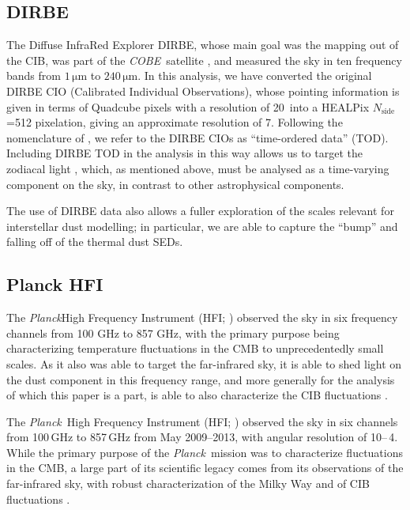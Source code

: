 \documentclass{aa}
\def\Planck{\textit{Planck}}
\def\COBE{\textit{COBE}}
\def\nside{$N_{\mathrm{side}}$}
\begin{document}
\subsection{DIRBE}
The Diffuse InfraRed Explorer DIRBE, whose main goal was the mapping out of the
CIB, was part of the \COBE\ satellite \citep{boggess92, silverberg93}, and
measured the sky in ten frequency bands from $1\,\mathrm{\mu m}$ to
$240\,\mathrm{\mu m}$. In this analysis, we have converted the original DIRBE
CIO (Calibrated Individual Observations), whose pointing information is given
in terms of Quadcube pixels with a resolution of 20\arcs\ into a HEALPix
\nside=512 pixelation, giving an approximate resolution of 7\arcm. Following
the nomenclature of \cite{CG02_01}, we refer to the DIRBE CIOs as
``time-ordered data'' (TOD). Including DIRBE TOD in the analysis in this way
allows us to target the zodiacal light \citep{CG02_02}, which, as mentioned
above, must be analysed as a time-varying component on the sky, in contrast to
other astrophysical components.

The use of DIRBE data also allows a fuller exploration of the scales relevant
for interstellar dust modelling; in particular, we are able to capture the
``bump'' and falling off of the thermal dust SEDs. 

\subsection{Planck HFI}
The \Planck High Frequency Instrument (HFI; \citealt{planck2016-l03}) observed
the sky in six frequency channels from 100 GHz to 857 GHz, with the primary
purpose being characterizing temperature fluctuations in the CMB to
unprecedentedly small scales. As it also was able to target the far-infrared
sky, it is able to shed light on the dust component in this frequency range,
and more generally for the analysis of which this paper is a part, is able to
also characterize the CIB fluctuations
\citep{planck2014-a12,planck2013-XVII,lenz2019,mccarthy:2024}.

The \Planck\ High Frequency Instrument (HFI; \citealt{planck2016-l03}) observed the sky in six channels from 100\,GHz to 857\,GHz from May 2009--2013, with angular resolution of 10\arcm--\,4\arcm. While the primary purpose of the \Planck\ mission was to characterize fluctuations in the CMB, a large part of its scientific legacy comes from its observations of the far-infrared sky, with robust characterization of the Milky Way \citep{planck2013-XVII,planck2014-a12,planck2016-l03} and of CIB fluctuations \citep{planck2014-a12,planck2013-XVII,lenz2019,mccarthy:2024}.
\end{document}

